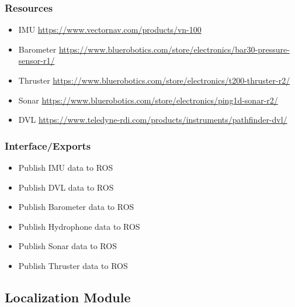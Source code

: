 \subsubsection{Resources}
\label{sec:resources}

\begin{itemize}
    \item IMU \url{https://www.vectornav.com/products/vn-100}
    \item Barometer \url{https://www.bluerobotics.com/store/electronics/bar30-pressure-sensor-r1/}
    \item Thruster \url{https://www.bluerobotics.com/store/electronics/t200-thruster-r2/}
    \item Sonar \url{https://www.bluerobotics.com/store/electronics/ping1d-sonar-r2/}
    \item DVL \url{https://www.teledyne-rdi.com/products/instruments/pathfinder-dvl/}
\end{itemize}

\subsubsection{Interface/Exports}
\label{sec:exports}

\begin{itemize}
    \item Publish IMU data to ROS 
    \item Publish DVL data to ROS 
    \item Publish Barometer data to ROS 
    \item Publish Hydrophone data to ROS 
    \item Publish Sonar data to ROS 
    \item Publish Thruster data to ROS
\end{itemize}

\subsection{Localization Module}
\label{sec:localization_design}

